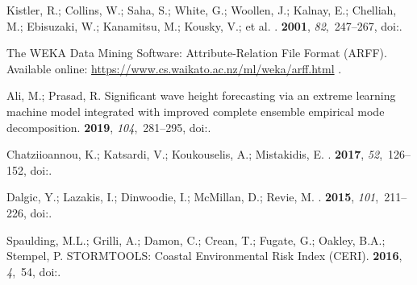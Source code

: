 \documentclass[energies,article,accept,moreauthors,pdftex]{Definitions/mdpi}
\begin{document}
\begin{thebibliography}{999}
Kistler, R.; Collins, W.; Saha, S.; White, G.; Woollen, J.; Kalnay, E.;
  Chelliah, M.; Ebisuzaki, W.; Kanamitsu, M.; Kousky, V.; et al.
.
 {\bf 2001},
  {\em 82},~247--267, 
\newblock
  doi:{\href{https://doi.org/10.1175/1520-0477(2001)082<0247:TNNYRM>2.3.CO;2}{}}.

{The WEKA Data Mining Software: {Attribute-Relation File Format (ARFF)}}.
\newblock Available online: \url{https://www.cs.waikato.ac.nz/ml/weka/arff.html}
.

Ali, M.; Prasad, R.
\newblock Significant wave height forecasting via an extreme learning machine
  model integrated with improved complete ensemble empirical mode
  decomposition.
 {\bf 2019}, {\em
  104},~281--295, 
\newblock
  doi:{\href{https://doi.org/10.1016/j.rser.2019.01.014}{}}.

Chatziioannou, K.; Katsardi, V.; Koukouselis, A.; Mistakidis, E.
.
 {\bf 2017}, {\em 52},~126--152, 
\newblock
  doi:{\href{https://doi.org/10.1016/j.marstruc.2016.11.003}{}}.

Dalgic, Y.; Lazakis, I.; Dinwoodie, I.; McMillan, D.; Revie, M.
.
 {\bf 2015}, {\em 101},~211--226, 
\newblock
  doi:{\href{https://doi.org/10.1016/j.oceaneng.2015.04.040}{}}.

Spaulding, M.L.; Grilli, A.; Damon, C.; Crean, T.; Fugate, G.; Oakley, B.A.;
  Stempel, P.
\newblock STORMTOOLS: Coastal Environmental Risk Index (CERI).
 {\bf 2016}, {\em
  4},~54, 
\newblock
  doi:{\href{https://doi.org/10.3390/jmse4030054}{}}.


\end{thebibliography}
\end{document}
